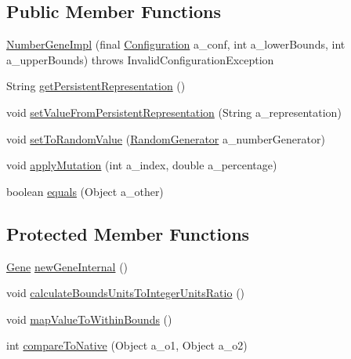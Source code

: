 \subsection*{Public Member Functions}
\begin{DoxyCompactItemize}
\item 
\hyperlink{classorg_1_1jgap_1_1impl_1_1_number_gene_test_1_1_number_gene_impl_a04ced488f291dbe62fae44f61f8a2425}{Number\-Gene\-Impl} (final \hyperlink{classorg_1_1jgap_1_1_configuration}{Configuration} a\-\_\-conf, int a\-\_\-lower\-Bounds, int a\-\_\-upper\-Bounds)  throws Invalid\-Configuration\-Exception 
\item 
String \hyperlink{classorg_1_1jgap_1_1impl_1_1_number_gene_test_1_1_number_gene_impl_a4650fd61d86fae144300e230de0a4c0b}{get\-Persistent\-Representation} ()
\item 
void \hyperlink{classorg_1_1jgap_1_1impl_1_1_number_gene_test_1_1_number_gene_impl_ab5392ff8df1b30eda8285f2650667798}{set\-Value\-From\-Persistent\-Representation} (String a\-\_\-representation)
\item 
void \hyperlink{classorg_1_1jgap_1_1impl_1_1_number_gene_test_1_1_number_gene_impl_a2b5cf8d97f823fbca3c0d1fb54690324}{set\-To\-Random\-Value} (\hyperlink{interfaceorg_1_1jgap_1_1_random_generator}{Random\-Generator} a\-\_\-number\-Generator)
\item 
void \hyperlink{classorg_1_1jgap_1_1impl_1_1_number_gene_test_1_1_number_gene_impl_a4499c0baa8d3c60ede4b70deb58fba49}{apply\-Mutation} (int a\-\_\-index, double a\-\_\-percentage)
\item 
boolean \hyperlink{classorg_1_1jgap_1_1impl_1_1_number_gene_test_1_1_number_gene_impl_a12d28d768d39ab04fa01a7c0b2dab8b0}{equals} (Object a\-\_\-other)
\end{DoxyCompactItemize}
\subsection*{Protected Member Functions}
\begin{DoxyCompactItemize}
\item 
\hyperlink{interfaceorg_1_1jgap_1_1_gene}{Gene} \hyperlink{classorg_1_1jgap_1_1impl_1_1_number_gene_test_1_1_number_gene_impl_a4dcdc2431e0b48f6d53f4cdbdc605996}{new\-Gene\-Internal} ()
\item 
void \hyperlink{classorg_1_1jgap_1_1impl_1_1_number_gene_test_1_1_number_gene_impl_a018aeeef3cfbc224f98ec12352b614f2}{calculate\-Bounds\-Units\-To\-Integer\-Units\-Ratio} ()
\item 
void \hyperlink{classorg_1_1jgap_1_1impl_1_1_number_gene_test_1_1_number_gene_impl_a2a4600159ee917898b7781df844c8b63}{map\-Value\-To\-Within\-Bounds} ()
\item 
int \hyperlink{classorg_1_1jgap_1_1impl_1_1_number_gene_test_1_1_number_gene_impl_a4c4c1ff0b5e3f3521119ae0b5e374cd6}{compare\-To\-Native} (Object a\-\_\-o1, Object a\-\_\-o2)
\end{DoxyCompactItemize}
